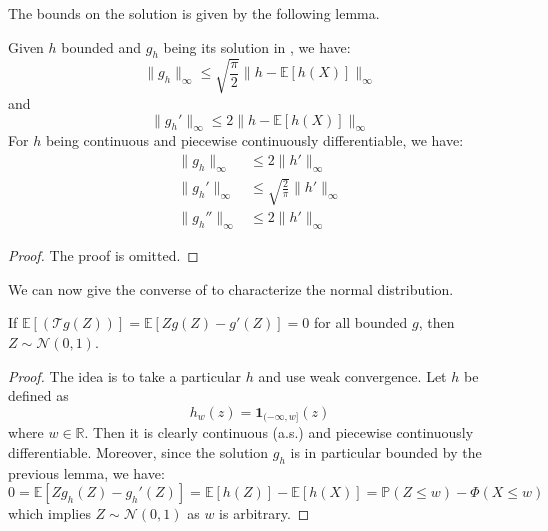 \documentclass{article}
\begin{document}
The bounds on the solution is given by the following lemma.  
\begin{lemma}\label{lem:stein_equation_normal_bound}
    Given $h$ bounded and $g_h$ being its solution in , we have:
    \begin{equation*}
        \|g_h\|_\infty \leq \sqrt{\frac{\pi}{2}} \|h - \mathbb{E}[h(X)]\|_\infty
    \end{equation*}
    and 
    \begin{equation*}
        \|g_h'\|_\infty \leq 2 \|h-\mathbb{E}[h(X)]\|_\infty
    \end{equation*}
    For $h$ being continuous and piecewise continuously differentiable, we have:
    \begin{align*}
        \|g_h\|_\infty &\leq 2 \|h'\|_\infty \\
        \|g_h'\|_\infty &\leq \sqrt{\frac{2}{\pi}} \|h'\|_\infty\\
        \|g_h''\|_\infty &\leq 2 \|h'\|_\infty
    \end{align*}
\end{lemma}
\begin{proof}
    The proof is omitted.
\end{proof}

We can now give the converse of  to characterize the normal distribution.  

\begin{theorem}
    If $\mathbb{E}[(\mathcal{T}g(Z))]=\mathbb{E}[Zg(Z) - g'(Z)] = 0$ for all bounded $g$, then $Z\sim \mathcal{N}(0,1)$.
\end{theorem}

\begin{proof}
    The idea is to take a particular $h$ and use weak convergence. Let $h$ be defined as 
    \begin{equation*}
        h_w(z) = \mathbf{1}_{(-\infty, w]}(z)
    \end{equation*}
    where $w\in \mathbb{R}$. Then it is clearly continuous (a.s.) and piecewise continuously differentiable. Moreover, since the solution $g_h$ is in particular bounded by the previous lemma, we have:  
    \begin{equation*}
        0 = \mathbb{E}[Zg_h(Z)-g_h'(Z)] = \mathbb{E}[h(Z)] - \mathbb{E}[h(X)]=\mathbb{P}(Z\leq w) - \Phi(X\leq w)
    \end{equation*}
    which implies $Z\sim \mathcal{N}(0,1)$ as $w$ is arbitrary.
\end{proof}
\end{document}
